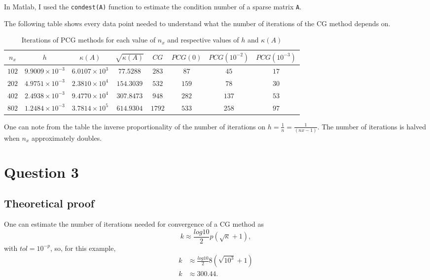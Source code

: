 \documentclass[a4paper, 11pt]{article}
\begin{document}
			In Matlab, I used the \texttt{condest(A)} function to estimate the condition number of a sparse matrix \texttt{A}.
			
			The following table shows every data point needed to understand what the number of iterations of the CG method depends on.
		
			\begin{table}[H]
				\centering
				\begin{tabular}{c|c|c|c|c|c|c|c}
					$n_x$   & $ h $						& $\kappa(A)$			 & $ \sqrt{\kappa(A)} $& $ CG $ & $ PCG(0) $& $PCG(10^{-2})$& $PCG(10^{-3})$ \\ \hline
					$ 102 $ & $ 9.9009 \times 10^{-3} $ & $ 6.0107 \times 10^3 $ & $ 77.5288 $ 		& $ 283 $ 	& $ 87 $ 	& $ 45 $ 		& $ 17 $ 		\\ \hline
					$ 202 $ & $ 4.9751 \times 10^{-3} $ & $ 2.3810 \times 10^4 $ & $ 154.3039 $ 	& $ 532 $ 	& $ 159 $ 	& $ 78 $ 		& $ 30 $ 		\\ \hline
					$ 402 $ & $ 2.4938 \times 10^{-3} $ & $ 9.4770 \times 10^4 $ & $ 307.8473 $ 	& $ 948 $ 	& $ 282 $ 	& $ 137 $ 		& $ 53 $		\\ \hline
					$ 802 $ & $ 1.2484 \times 10^{-3} $ & $ 3.7814 \times 10^5 $ & $ 614.9304 $ 	& $ 1792 $	& $ 533 $ 	& $ 258 $ 		& $ 97 $ 		\\ 
				\end{tabular}
				\caption{Iterations of PCG methods for each value of $n_x$ and respective values of $h$ and $\kappa(A)$}
				\label{table:ex2}
			\end{table}	
		
			One can note from the table the inverse proportionality of the number of iterations on $ h = \frac{1}{n} = \frac{1}{(nx-1)} $.
			The number of iterations is halved when $n_x$ approximately doubles.		
							
		\section*{Question 3}
		
			\subsection*{Theoretical proof}
			
			One can estimate the number of iterations needed for convergence of a CG method as
			\begin{equation}
				k \approx \frac{log10}{2}p(\sqrt{\kappa}+1),
			\end{equation}
			with $tol = 10^{-p}$, so, for this example,
			\begin{align}
				k &\approx \frac{log10}{2}8(\sqrt{10^3}+1) \\
				k &\approx 300.44.		
			\end{align}
		
\end{document}
